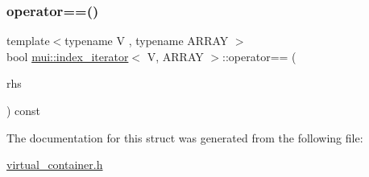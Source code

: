 \subsubsection{\texorpdfstring{operator==()}{operator==()}}
{\footnotesize\ttfamily template$<$typename V , typename A\+R\+R\+AY $>$ \\
bool \hyperlink{structmui_1_1index__iterator}{mui\+::index\+\_\+iterator}$<$ V, A\+R\+R\+AY $>$\+::operator== (\begin{DoxyParamCaption}\item[{const \hyperlink{structmui_1_1index__iterator}{index\+\_\+iterator}$<$ V, A\+R\+R\+AY $>$ \&}]{rhs }\end{DoxyParamCaption}) const\hspace{0.3cm}{\ttfamily [inline]}}



The documentation for this struct was generated from the following file\+:\begin{DoxyCompactItemize}
\item 
\hyperlink{virtual__container_8h}{virtual\+\_\+container.\+h}\end{DoxyCompactItemize}
